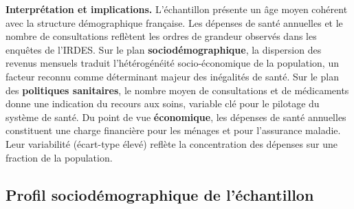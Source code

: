 \documentclass[11pt,a4paper]{memoirerecherche}
\begin{document}
\begin{table}[!h]
\centering
\caption{\label{tab:tab-desc-quant}Statistiques descriptives des variables quantitatives.}
\centering
{}
\end{table}

\textbf{Interprétation et implications.} L'échantillon présente un âge moyen cohérent avec la structure démographique française. Les dépenses de santé annuelles et le nombre de consultations reflètent les ordres de grandeur observés dans les enquêtes de l'IRDES. Sur le plan \textbf{sociodémographique}, la dispersion des revenus mensuels traduit l'hétérogénéité socio-économique de la population, un facteur reconnu comme déterminant majeur des inégalités de santé. Sur le plan des \textbf{politiques sanitaires}, le nombre moyen de consultations et de médicaments donne une indication du recours aux soins, variable clé pour le pilotage du système de santé. Du point de vue \textbf{économique}, les dépenses de santé annuelles constituent une charge financière pour les ménages et pour l'assurance maladie. Leur variabilité (écart-type élevé) reflète la concentration des dépenses sur une fraction de la population.

\hypertarget{profil-socioduxe9mographique-de-luxe9chantillon}{%
\subsection{Profil sociodémographique de l'échantillon}\label{profil-socioduxe9mographique-de-luxe9chantillon}}
\end{document}
